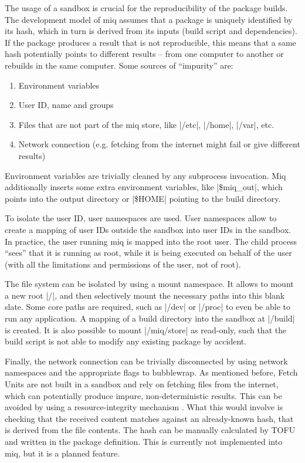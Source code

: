 The usage of a sandbox is crucial for the reproducibility of
the package builds. The development model of miq assumes
that a package is uniquely identified by its hash, which in
turn is derived from its inputs (build script and
dependencies). If the package produces a result that is not
reproducible, this means that a same hash potentially points
to different results -- from one computer to another or
rebuilds in the same computer. Some sources of
``impurity'' are:

\begin{enumerate}
    \item Environment variables
    \item User ID, name and groups
    \item Files that are not part of the miq store, like
    |/etc|, |/home|, |/var|, etc.
    \item Network connection (e.g. fetching from the
    internet might fail or give different results)
\end{enumerate}

Environment variables are trivially cleaned by any
subprocess invocation. Miq additionally inserts some extra
environment variables, like |\$miq_out|, which points into
the output directory or |\$HOME| pointing to the build
directory.

To isolate the user ID, user namespaces are used. User
namespaces allow to create a mapping of user IDs outside the
sandbox into user IDs in the sandbox. In practice, the user
running miq is mapped into the root user. The child process
``sees'' that it is running as root, while it is being
executed on behalf of the user (with all the limitations and
permissions of the user, not of root).

The file system can be isolated by using a mount namespace.
It allows to mount a new root |/|,
and then selectively mount the necessary paths into this
blank slate. Some core paths are required, such as |/dev| or
|/proc| to even be able to run any application. A mapping of
a build directory into the sandbox at |/build| is created.
It is also possible to mount |/miq/store| as read-only, such
that the build script is not able to modify any existing
package by accident.

Finally, the network connection can be trivially
disconnected by using network namespaces and the appropriate
flags to bubblewrap. As mentioned before, Fetch Units are
not built in a sandbox and rely on fetching files from the
internet, which can potentially produce impure,
non-deterministic results. This can be avoided by using a
resource-integrity mechanism
\cite{chapuisEmpiricalStudyUse2020} . What this would
involve is checking that the received content matches
against an already-known hash, that is derived from the file
contents. The hash can be manually calculated by \acl{TOFU}
and written in the package definition. This is currently not
implemented into miq, but it is a planned feature.

